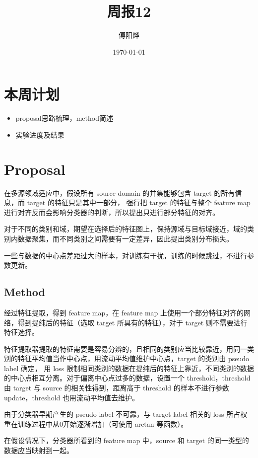\documentclass[UTF8]{ctexart}
\title{周报12}
\author{傅阳烨}
\date{\today}
\begin{document}
\maketitle
\section{本周计划}
\begin{itemize}
    \item proposal思路梳理，method简述
    \item 实验进度及结果
\end{itemize}

\section{Proposal}

在多源领域适应中，假设所有 source domain 的并集能够包含 target 的所有信息，而 target 的特征只是其中一部分，
强行把 target 的特征与整个 feature map 进行对齐反而会影响分类器的判断，所以提出只进行部分特征的对齐。

对于不同的类别和域，期望在选择后的特征图上，保持源域与目标域接近，域的类别内数据聚集，而不同类别之间需要有一定差异，因此提出类别分布损失。

一些与数据的中心点差距过大的样本，对训练有干扰，训练的时候跳过，不进行参数更新。

\subsection{Method}

经过特征提取，得到 feature map，在 feature map 上使用一个部分特征对齐的网络，得到提纯后的特征（选取 target 所具有的特征），对于 target 则不需要进行特征选择。

特征提取器提取的特征需要是容易分辨的，且相同的类别应当比较靠近，用同一类别的特征平均值当作中心点，用流动平均值维护中心点，target 的类别由 pseudo label 确定，
用 loss 限制相同类别的数据在提纯后的特征上靠近，不同类别的数据的中心点相互分离。对于偏离中心点过多的数据，设置一个 threshold，threshold 由 target 与 source 的相关性得到，距离高于 threshold 的样本不进行参数 update，threshold 也用流动平均值去维护。

由于分类器早期产生的 pseudo label 不可靠，与 target label 相关的 loss 所占权重在训练过程中从0开始逐渐增加（可使用 arctan 等函数）。

在假设情况下，分类器所看到的 feature map 中，source 和 target 的同一类型的数据应当映射到一起。
\end{document}
